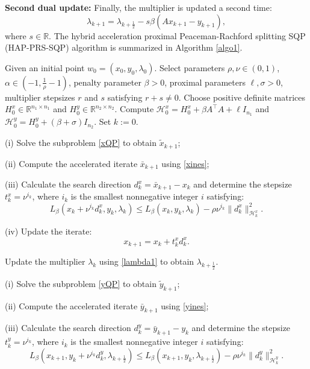 \documentclass[pdflatex,sn-mathphys-num]{sn-jnl}%
\theoremstyle{thmstyleone}%
\theoremstyle{thmstyletwo}%
\theoremstyle{thmstylethree}%
\begin{document}
\textbf{Second dual update:}
Finally, the multiplier is updated a second time:
\begin{equation}\label{lambda2}
\lambda_{k+1} = \lambda_{k+\frac{1}{2}}-s \beta(A x_{k+1}-y_{k+1}),
\end{equation}
where $s\in \mathbb{R}$.
The hybrid acceleration proximal Peaceman-Rachford splitting SQP (HAP-PRS-SQP) algorithm is summarized in Algorithm \ref{algo1}.
\begin{algorithm}[]
\caption{HAP-PRS-SQP algorithm}\label{algo1}

 Given an initial point $w_0=(x_0,y_0,\lambda_0)$. Select parameters $\rho,\nu\in (0,1)$, $\alpha \in (-1, \frac{1}{\rho}-1)$, penalty parameter $\beta>0$, proximal parameters $\ell,\sigma>0$, multiplier stepsizes $r$ and $s$ satisfying $r+s\not=0$. Choose positive definite matrices $H_0^x \in \mathbb{R}^{n_1\times n_1}$ and $H_0^y\in \mathbb{R}^{n_2\times n_2}$. Compute $\mathcal{H}_0^x=H_0^x+\beta A^{\top}A+\ell I_{n_1}$ and $\mathcal{H}_0^y=H_0^y+(\beta +\sigma) I_{n_2}$. Set $k:= 0$.

 (i) Solve the subproblem \eqref{xQP} to obtain $\tilde{x}_{k+1}$;

(ii) Compute the accelerated iterate $\bar{x}_{k+1}$ using \eqref{xines};

(iii) Calculate the search direction $d_{k}^{x} = \bar{x}_{k+1}-x_{k}$ and determine the stepsize $t_k^x=\nu^{i_k}$, where $i_k$ is the smallest nonnegative integer $i$ satisfying:
\begin{equation}\label{xlines}
L_{\beta}(x_{k}+\nu^{i_k}d_{k}^{x}, y_{k}, \lambda_{k}) \leq L_{\beta}(x_{k}, y_{k}, \lambda_{k})-\rho \nu^{i_k}\|d_{k}^{x}\|_{\mathcal{H}_k^x}^{2}.
\end{equation}

(iv) Update the iterate:
\begin{equation}\label{newx}
x_{k+1}=x_{k}+t_{k}^{x} d_{k}^{x}.
\end{equation}

 Update the multiplier $\lambda_{k}$ using \eqref{lambda1} to obtain $\lambda_{k+\frac12}$.

 (i) Solve the subproblem \eqref{yQP} to obtain $\tilde{y}_{k+1}$;

(ii) Compute the accelerated iterate $\bar{y}_{k+1}$ using \eqref{yines};

(iii) Calculate the search direction $d_{k}^{y} = \bar{y}_{k+1}-y_{k}$ and determine the stepsize $t_k^y=\nu^{i_k}$, where $i_k$ is the smallest nonnegative integer $i$ satisfying:
\begin{equation}\label{ylines}
L_{\beta}(x_{k+1}, y_{k}+\nu^{i_k} d_{k}^{y}, \lambda_{k+\frac{1}{2}}) \leq L_{\beta}(x_{k+1}, y_{k}, \lambda_{k+\frac{1}{2}})- \rho \nu^{i_k}\|d_{k}^{y}\|_{\mathcal{H}_k^y}^{2}.
\end{equation}


\end{algorithm}
\end{document}
